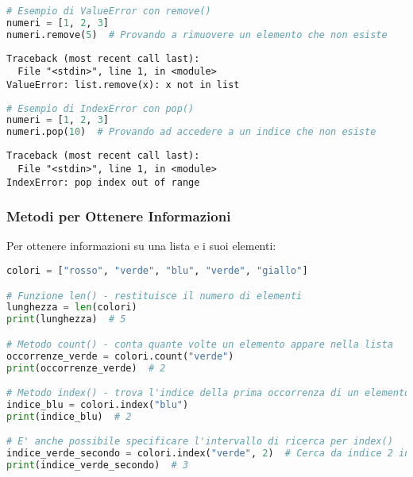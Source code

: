 \begin{lstlisting}[language=Python]
# Esempio di ValueError con remove()
numeri = [1, 2, 3]
numeri.remove(5)  # Provando a rimuovere un elemento che non esiste
\end{lstlisting}

\begin{tcolorbox}[colback=red!5!white,colframe=red!75!black,fonttitle=\bfseries,title=Output del terminale]
\begin{verbatim}
Traceback (most recent call last):
  File "<stdin>", line 1, in <module>
ValueError: list.remove(x): x not in list
\end{verbatim}
\end{tcolorbox}

\begin{lstlisting}[language=Python]
# Esempio di IndexError con pop()
numeri = [1, 2, 3]
numeri.pop(10)  # Provando ad accedere a un indice che non esiste
\end{lstlisting}

\begin{tcolorbox}[colback=red!5!white,colframe=red!75!black,fonttitle=\bfseries,title=Output del terminale]
\begin{verbatim}
Traceback (most recent call last):
  File "<stdin>", line 1, in <module>
IndexError: pop index out of range
\end{verbatim}
\end{tcolorbox}

\subsubsection{Metodi per Ottenere Informazioni}\label{MetodiInfoListe}

Per ottenere informazioni su una lista e i suoi elementi:

\begin{lstlisting}[language=Python]
colori = ["rosso", "verde", "blu", "verde", "giallo"]

# Funzione len() - restituisce il numero di elementi
lunghezza = len(colori)
print(lunghezza)  # 5

# Metodo count() - conta quante volte un elemento appare nella lista
occorrenze_verde = colori.count("verde")
print(occorrenze_verde)  # 2

# Metodo index() - trova l'indice della prima occorrenza di un elemento
indice_blu = colori.index("blu")
print(indice_blu)  # 2

# E' anche possibile specificare l'intervallo di ricerca per index()
indice_verde_secondo = colori.index("verde", 2)  # Cerca da indice 2 in poi
print(indice_verde_secondo)  # 3
\end{lstlisting}

